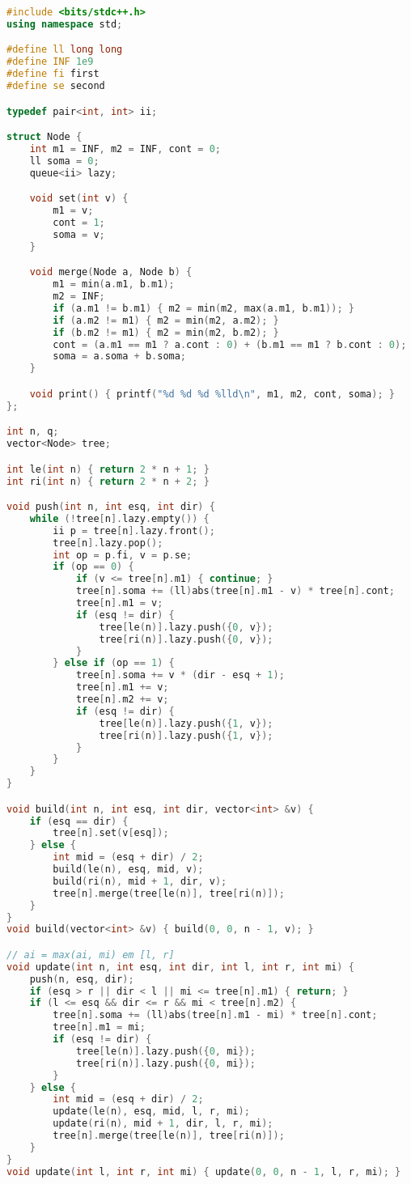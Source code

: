 \documentclass[11pt, a4paper, twoside]{article}
\begin{document}
\begin{lstlisting}[language=C++]
#include <bits/stdc++.h>
using namespace std;

#define ll long long
#define INF 1e9
#define fi first
#define se second

typedef pair<int, int> ii;

struct Node {
    int m1 = INF, m2 = INF, cont = 0;
    ll soma = 0;
    queue<ii> lazy;

    void set(int v) {
        m1 = v;
        cont = 1;
        soma = v;
    }

    void merge(Node a, Node b) {
        m1 = min(a.m1, b.m1);
        m2 = INF;
        if (a.m1 != b.m1) { m2 = min(m2, max(a.m1, b.m1)); }
        if (a.m2 != m1) { m2 = min(m2, a.m2); }
        if (b.m2 != m1) { m2 = min(m2, b.m2); }
        cont = (a.m1 == m1 ? a.cont : 0) + (b.m1 == m1 ? b.cont : 0);
        soma = a.soma + b.soma;
    }

    void print() { printf("%d %d %d %lld\n", m1, m2, cont, soma); }
};

int n, q;
vector<Node> tree;

int le(int n) { return 2 * n + 1; }
int ri(int n) { return 2 * n + 2; }

void push(int n, int esq, int dir) {
    while (!tree[n].lazy.empty()) {
        ii p = tree[n].lazy.front();
        tree[n].lazy.pop();
        int op = p.fi, v = p.se;
        if (op == 0) {
            if (v <= tree[n].m1) { continue; }
            tree[n].soma += (ll)abs(tree[n].m1 - v) * tree[n].cont;
            tree[n].m1 = v;
            if (esq != dir) {
                tree[le(n)].lazy.push({0, v});
                tree[ri(n)].lazy.push({0, v});
            }
        } else if (op == 1) {
            tree[n].soma += v * (dir - esq + 1);
            tree[n].m1 += v;
            tree[n].m2 += v;
            if (esq != dir) {
                tree[le(n)].lazy.push({1, v});
                tree[ri(n)].lazy.push({1, v});
            }
        }
    }
}

void build(int n, int esq, int dir, vector<int> &v) {
    if (esq == dir) {
        tree[n].set(v[esq]);
    } else {
        int mid = (esq + dir) / 2;
        build(le(n), esq, mid, v);
        build(ri(n), mid + 1, dir, v);
        tree[n].merge(tree[le(n)], tree[ri(n)]);
    }
}
void build(vector<int> &v) { build(0, 0, n - 1, v); }

// ai = max(ai, mi) em [l, r]
void update(int n, int esq, int dir, int l, int r, int mi) {
    push(n, esq, dir);
    if (esq > r || dir < l || mi <= tree[n].m1) { return; }
    if (l <= esq && dir <= r && mi < tree[n].m2) {
        tree[n].soma += (ll)abs(tree[n].m1 - mi) * tree[n].cont;
        tree[n].m1 = mi;
        if (esq != dir) {
            tree[le(n)].lazy.push({0, mi});
            tree[ri(n)].lazy.push({0, mi});
        }
    } else {
        int mid = (esq + dir) / 2;
        update(le(n), esq, mid, l, r, mi);
        update(ri(n), mid + 1, dir, l, r, mi);
        tree[n].merge(tree[le(n)], tree[ri(n)]);
    }
}
void update(int l, int r, int mi) { update(0, 0, n - 1, l, r, mi); }


\end{lstlisting}
\end{document}
